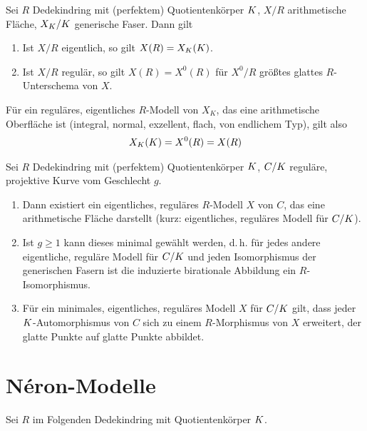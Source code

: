 \documentclass[german]{scrreprt}
\begin{document}
\begin{Satz}
  Sei $R$ Dedekindring mit (perfektem) Quotientenkörper $K$,
  $X/R$ arithmetische Fläche, $X_{K}/K$ generische Faser.
  Dann gilt
  \begin{enumerate}[label=(\roman*)]
  \item Ist $X/R$ eigentlich, so gilt $X(R)=X_{K}(K)$.
  \item Ist $X/R$ regulär, so gilt $X(R)=X^0(R)$ für $X^0/R$ größtes
    glattes $R$-Unterschema von $X$.
  \end{enumerate}
  \cite[Corollary IV.4.4]{silverman2}

  Für ein reguläres, eigentliches $R$-Modell von $X_K$, das eine
  arithmetische Oberfläche ist (integral, normal, exzellent, flach,
  von endlichem Typ), gilt also
  \begin{gather*}
    X_{K}(K)=X^0(R)=X(R)
  \end{gather*}
\end{Satz}

\begin{Satz}
  Sei $R$ Dedekindring mit (perfektem) Quotientenkörper $K$,
  $C/K$ reguläre, projektive Kurve vom Geschlecht $g$.
  \begin{enumerate}[label=(\roman*)]
  \item Dann existiert ein eigentliches, reguläres $R$-Modell $X$ von $C$,
    das eine arithmetische Fläche darstellt
    (kurz: eigentliches, reguläres Modell für $C/K$).
    \cite[Proposition IV.4.5(a)]{silverman2}
  \item Ist $g\geq1$ kann dieses minimal gewählt werden, d.\,h.
    für jedes andere eigentliche, reguläre Modell für $C/K$ und jeden
    Isomorphismus der generischen Fasern ist die induzierte birationale
    Abbildung ein $R$-Isomorphismus.
    \cite[Proposition IV.4.5(b)]{silverman2}
  \item Für ein minimales, eigentliches, reguläres Modell $X$ für $C/K$
    gilt, dass jeder $K$-Automorphismus von $C$ sich zu einem
    $R$-Morphismus von $X$ erweitert, der glatte Punkte auf glatte
    Punkte abbildet.
    \cite[Proposition IV.4.6]{silverman2}
  \end{enumerate}
\end{Satz}

\chapter{Néron-Modelle}
Sei $R$ im Folgenden Dedekindring mit Quotientenkörper $K$.
\end{document}
